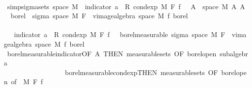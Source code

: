 \begin{isabellebody}
\ \ \ \ \ \ \isamarkupfalse%
\ {\isacharminus}{\kern0pt}\isanewline
\ \ \ \ \ \ \ \ \isamarkupfalse%
\ {\isacharbrackleft}{\kern0pt}simp{\isacharbrackright}{\kern0pt}{\isacharcolon}{\kern0pt}{\isachardoublequoteopen}sigma{\isacharunderscore}{\kern0pt}sets\ {\isacharparenleft}{\kern0pt}space\ M{\isacharparenright}{\kern0pt}\ {\isacharbraceleft}{\kern0pt}{\isacharparenleft}{\kern0pt}{\isasymlambda}{\isasymomega}{\isachardot}{\kern0pt}\ indicator\ a\ {\isasymomega}\ {\isacharasterisk}{\kern0pt}\isactrlsub R\ cond{\isacharunderscore}{\kern0pt}exp\ M\ F\ f\ {\isasymomega}{\isacharparenright}{\kern0pt}\ {\isacharminus}{\kern0pt}{\isacharbackquote}{\kern0pt}\ A\ {\isasyminter}\ space\ M\ {\isacharbar}{\kern0pt}A{\isachardot}{\kern0pt}\ A\ {\isasymin}\ borel{\isacharbraceright}{\kern0pt}\ {\isasymsubseteq}\ sigma\ {\isacharparenleft}{\kern0pt}space\ M{\isacharparenright}{\kern0pt}\ {\isacharparenleft}{\kern0pt}F\ {\isasymunion}\ vimage{\isacharunderscore}{\kern0pt}algebra\ {\isacharparenleft}{\kern0pt}space\ M{\isacharparenright}{\kern0pt}\ f\ borel{\isacharparenright}{\kern0pt}{\isachardoublequoteclose}\isanewline
\ \ \ \ \ \ \ \ \isamarkupfalse%
\ {\isacharminus}{\kern0pt}\isanewline
\ \ \ \ \ \ \ \ \ \ \isamarkupfalse%
\ {\isacharasterisk}{\kern0pt}{\isacharcolon}{\kern0pt}\ {\isachardoublequoteopen}{\isacharparenleft}{\kern0pt}{\isasymlambda}{\isasymomega}{\isachardot}{\kern0pt}\ indicator\ a\ {\isasymomega}\ {\isacharasterisk}{\kern0pt}\isactrlsub R\ cond{\isacharunderscore}{\kern0pt}exp\ M\ F\ f\ {\isasymomega}{\isacharparenright}{\kern0pt}\ {\isasymin}\ borel{\isacharunderscore}{\kern0pt}measurable\ {\isacharparenleft}{\kern0pt}sigma\ {\isacharparenleft}{\kern0pt}space\ M{\isacharparenright}{\kern0pt}\ {\isacharparenleft}{\kern0pt}F\ {\isasymunion}\ vimage{\isacharunderscore}{\kern0pt}algebra\ {\isacharparenleft}{\kern0pt}space\ M{\isacharparenright}{\kern0pt}\ f\ borel{\isacharparenright}{\kern0pt}{\isacharparenright}{\kern0pt}{\isachardoublequoteclose}\isanewline
\ \ \ \ \ \ \ \ \ \ \ \ \isamarkupfalse%
\ borel{\isacharunderscore}{\kern0pt}measurable{\isacharunderscore}{\kern0pt}indicator{\isacharbrackleft}{\kern0pt}OF\ A{\isacharparenleft}{\kern0pt}{}{\isacharparenright}{\kern0pt}{\isacharcomma}{\kern0pt}\ THEN\ measurable{\isacharunderscore}{\kern0pt}sets{\isacharcomma}{\kern0pt}\ OF\ borel{\isacharunderscore}{\kern0pt}open{\isacharbrackright}{\kern0pt}\ subalgebra\ \isanewline
\ \ \ \ \ \ \ \ \ \ \ \ \ \ \ \ \ \ borel{\isacharunderscore}{\kern0pt}measurable{\isacharunderscore}{\kern0pt}cond{\isacharunderscore}{\kern0pt}exp{\isacharbrackleft}{\kern0pt}THEN\ measurable{\isacharunderscore}{\kern0pt}sets{\isacharcomma}{\kern0pt}\ OF\ borel{\isacharunderscore}{\kern0pt}open{\isacharcomma}{\kern0pt}\ of\ {\isacharunderscore}{\kern0pt}\ M\ F\ f{\isacharbrackright}{\kern0pt}\isanewline

\end{isabellebody}
